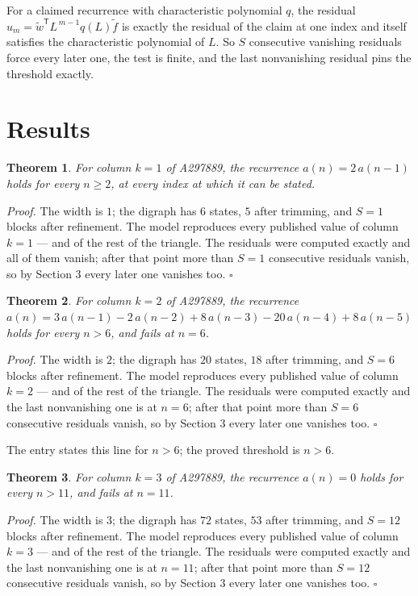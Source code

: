 \documentclass[11pt]{article}
\newtheorem{theorem}{Theorem}
\theoremstyle{definition}
\begin{document}
For a claimed recurrence with characteristic polynomial $q$, the residual $u_m = \tilde w^{\mathsf T}L^{\,m-1}q(L)\tilde f$ is exactly the residual of the claim at one index and itself satisfies the characteristic polynomial of $L$. So $S$ consecutive vanishing residuals force every later one, the test is finite, and the last nonvanishing residual pins the threshold exactly.

\section{Results}

\begin{theorem} For column $k = 1$ of A297889, the recurrence $a(n) = 2\,a(n-1)$ holds for every $n \ge 2$, at every index at which it can be stated.\end{theorem}

{\itshape Proof.} The width is $1$; the digraph has $6$ states, $5$ after trimming, and $S = 1$ blocks after refinement. The model reproduces every published value of column $k = 1$ --- and of the rest of the triangle. The residuals were computed exactly and all of them vanish; after that point more than $S = 1$ consecutive residuals vanish, so by Section 3 every later one vanishes too. $\square$

\begin{theorem} For column $k = 2$ of A297889, the recurrence $a(n) = 3\,a(n-1) - 2\,a(n-2) + 8\,a(n-3) - 20\,a(n-4) + 8\,a(n-5)$ holds for every $n > 6$, and fails at $n = 6$.\end{theorem}

{\itshape Proof.} The width is $2$; the digraph has $20$ states, $18$ after trimming, and $S = 6$ blocks after refinement. The model reproduces every published value of column $k = 2$ --- and of the rest of the triangle. The residuals were computed exactly and the last nonvanishing one is at $n = 6$; after that point more than $S = 6$ consecutive residuals vanish, so by Section 3 every later one vanishes too. $\square$

The entry states this line for $n > 6$; the proved threshold is $n > 6$.

\begin{theorem} For column $k = 3$ of A297889, the recurrence $a(n) = 0$ holds for every $n > 11$, and fails at $n = 11$.\end{theorem}

{\itshape Proof.} The width is $3$; the digraph has $72$ states, $53$ after trimming, and $S = 12$ blocks after refinement. The model reproduces every published value of column $k = 3$ --- and of the rest of the triangle. The residuals were computed exactly and the last nonvanishing one is at $n = 11$; after that point more than $S = 12$ consecutive residuals vanish, so by Section 3 every later one vanishes too. $\square$
\end{document}

